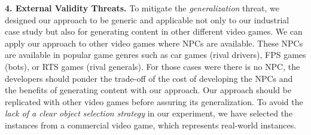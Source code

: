 \textbf{4. External Validity Threats.}
To mitigate the \textit{generalization} threat, we designed our approach to be generic and applicable not only to our industrial case study but also for generating content in other different video games. We can apply our approach to other video games where NPCs are available. These NPCs are available in popular game genres such as car games (rival drivers), FPS games (bots), or RTS games (rival generals). For those cases were there is no NPC, the developers should ponder the trade-off of the cost of developing the NPCs and the benefits of generating content with our approach. Our approach should be replicated with other video games before assuring its generalization.
To avoid the \textit{lack of a clear object selection strategy} in our experiment, we have selected the instances from a commercial video game, which represents real-world instances.

